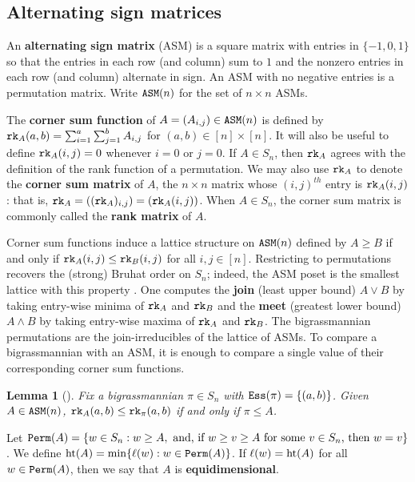 \documentclass[12pt,reqno]{amsart}
\newtheorem{lemma}[theorem]{Lemma}
\newtheorem{Main Conjecture}[theorem]{Main Conjecture}
\theoremstyle{remark}
\theoremstyle{plain}
\newcommand{\mydef}[1]{{\bf #1}}
\newcommand{\hgt}{{\rm{ht }}}
\newcommand{\ess}{{\tt Ess}}
\newcommand{\perm}{{\tt Perm}}
\newcommand{\asm}{{\tt ASM}}
\newcommand{\rk}{{\tt rk}}
\begin{document}
 
\subsection{Alternating sign matrices}

An \mydef{alternating sign matrix} (ASM) is a square matrix with entries in $\{-1,0,1\}$ so that the entries in each row (and column) sum to $1$ and the nonzero entries in each row (and column) alternate in sign.  An ASM with no negative entries is a permutation matrix.  Write $\asm(n)$ for the set of $n\times n$ ASMs.

 The \mydef{corner sum function} of $A = (A_{i,j}) \in \asm(n)$ is defined by $ \rk_A(a,b)=\sum_{i=1}^a\sum_{j=1}^b A_{i,j}$ for $(a,b) \in [n] \times [n]$.   It will also be useful to define $\rk_A(i,j)=0$ whenever $i=0$ or $j=0$.  If $A\in S_{n}$, then $\rk_A$ agrees with the definition of the rank function of a permutation.  We may also use $\rk_A$ to denote the \mydef{corner sum matrix} of $A$, the $n \times n$ matrix whose $(i,j)^{th}$ entry is $\rk_A(i,j)$: that is,  $\rk_A = ((\rk_{A})_{i,j})  = (\rk_A(i,j))$.  When $A \in S_n$, the corner sum matrix is commonly called the \mydef{rank matrix} of $A$.

Corner sum functions induce a lattice structure on $\asm(n)$ defined by $A\geq B$  if and only if  $\rk_A(i,j)\leq \rk_B(i,j)$ for all $i,j\in [n]$.  Restricting to permutations recovers the (strong) Bruhat order on $S_n$; indeed, the ASM poset is the smallest lattice with this property \cite[Lemme~5.4]{LS96}. One computes the \mydef{join} (least upper bound) $A\vee B$ by taking entry-wise minima  of $\rk_A$ and $\rk_B$ and the \mydef{meet} (greatest lower bound) $A\wedge B$ by taking entry-wise maxima of $\rk_A$ and $\rk_B$.  The bigrassmannian permutations are the join-irreducibles of the lattice of ASMs. To compare a bigrassmannian with an ASM, it is enough to compare a single value of their corresponding corner sum functions.
\begin{lemma}[{\cite[Theorem~30]{BS17}}]
	\label{lemma:bigrasscompare}
	Fix a bigrassmannian $\pi \in S_n$ with $\ess(\pi)=\{(a,b)\}$.  Given $A\in \asm(n)$,  $\rk_A(a,b)\leq \rk_\pi (a,b)$ if and only if $\pi \leq A$.
\end{lemma}

Let $\perm(A)=\{w\in S_n:w\geq A, \text{ and, if } w\geq v\geq A \mbox{ for some $v \in S_n$, then }  w=v\}$.  We define $\hgt(A) =\min\{\ell(w):w\in \perm(A)\}$.  If $\ell(w)=\hgt(A) $ for all $w\in \perm(A)$, then we say that $A$ is \mydef{equidimensional}.
\end{document}
